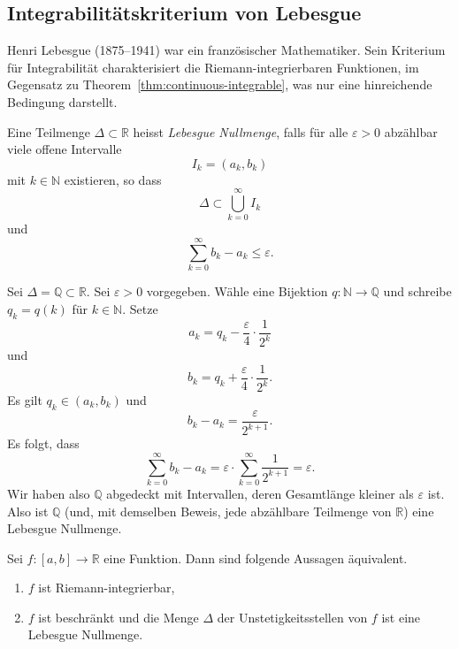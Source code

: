 \documentclass[../main.tex]{subfiles}
\begin{document}
\subsection*{Integrabilitätskriterium von Lebesgue}
Henri Lebesgue (1875--1941) war ein französischer Mathematiker.
Sein Kriterium für Integrabilität charakterisiert die
Riemann-integrierbaren Funktionen, im Gegensatz zu
Theorem~\ref{thm:continuous-integrable}, was nur eine
hinreichende Bedingung darstellt.

\begin{definition}
  Eine Teilmenge $\Delta \subset \mathbb{R}$ 
  heisst \emph{Lebesgue Nullmenge},
  falls für alle $\varepsilon > 0$ abzählbar viele
  offene Intervalle
  \[
    I_k = (a_k, b_k)
  \]
  mit $k \in \mathbb{N}$
  existieren, so dass 
  \[
    \Delta \subset \bigcup_{k=0}^{\infty} I_k
  \]
  und
  \[
    \sum_{k=0}^{\infty} b_k - a_k \leq \varepsilon.
  \]
\end{definition}

\begin{example}
  Sei $\Delta = \mathbb{Q} \subset \mathbb{R}$.
  Sei $\varepsilon > 0$ vorgegeben.
  Wähle eine Bijektion $q \colon\mathbb{N} \to \mathbb{Q}$ 
  und schreibe $q_k = q(k)$ für $k \in \mathbb{N}$.
  Setze
  \[
    a_k = q_k - \frac{\varepsilon}{4} \cdot \frac{1}{2^k}
  \]
  und
  \[
    b_k = q_k + \frac{\varepsilon}{4} \cdot \frac{1}{2^k}.
  \]
  Es gilt $q_k \in (a_k, b_k)$ und  
  \[
    b_k - a_k = \frac{\varepsilon}{2^{k+1}}.
  \]
  Es folgt, dass
  \[
    \sum_{k=0}^{\infty} b_k - a_k = \varepsilon \cdot
    \sum_{k=0}^{\infty} \frac{1}{2^{k+1}} = \varepsilon.
  \]
  Wir haben also $\mathbb{Q}$ abgedeckt mit Intervallen,
  deren Gesamtlänge kleiner als $\varepsilon$ ist.
  Also ist $\mathbb{Q}$ (und, mit demselben Beweis,
  jede abzählbare Teilmenge von $\mathbb{R}$)
  eine Lebesgue Nullmenge.
\end{example}

\begin{theorem}[Lebesgue 1901]
  Sei $f \colon [a, b] \to \mathbb{R}$ eine Funktion.
  Dann sind folgende Aussagen äquivalent.
  \begin{enumerate}[\normalfont(i)]
    \item $f$ ist  Riemann-integrierbar,
    \item $f$ ist beschränkt und die Menge
      $\Delta$ der Unstetigkeitsstellen von $f$ ist
      eine Lebesgue Nullmenge.
  \end{enumerate}
\end{theorem}
\end{document}
